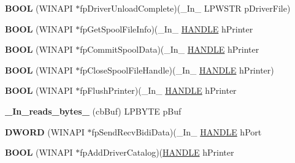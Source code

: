 \begin{DoxyCompactItemize}
\mbox{\label{struct___p_r_i_n_t_p_r_o_v_i_d_o_r_a92fa81120c31a8ae567e6370fe8784fe}} 
{\bfseries B\+O\+OL} (W\+I\+N\+A\+PI $\ast$fp\+Driver\+Unload\+Complete)(\+\_\+\+In\+\_\+ L\+P\+W\+S\+TR p\+Driver\+File)
\item 
\mbox{\label{struct___p_r_i_n_t_p_r_o_v_i_d_o_r_afe37be4207dce2d26e65494e7a05f1eb}} 
{\bfseries B\+O\+OL} (W\+I\+N\+A\+PI $\ast$fp\+Get\+Spool\+File\+Info)(\+\_\+\+In\+\_\+ \hyperlink{interfacevoid}{H\+A\+N\+D\+LE} h\+Printer
\item 
\mbox{\label{struct___p_r_i_n_t_p_r_o_v_i_d_o_r_af505fe62878139c4e4bd8189414ad229}} 
{\bfseries B\+O\+OL} (W\+I\+N\+A\+PI $\ast$fp\+Commit\+Spool\+Data)(\+\_\+\+In\+\_\+ \hyperlink{interfacevoid}{H\+A\+N\+D\+LE} h\+Printer
\item 
\mbox{\label{struct___p_r_i_n_t_p_r_o_v_i_d_o_r_a56e7cdcb09cbcbadaa28f021727e9acd}} 
{\bfseries B\+O\+OL} (W\+I\+N\+A\+PI $\ast$fp\+Close\+Spool\+File\+Handle)(\+\_\+\+In\+\_\+ \hyperlink{interfacevoid}{H\+A\+N\+D\+LE} h\+Printer)
\item 
\mbox{\label{struct___p_r_i_n_t_p_r_o_v_i_d_o_r_af7902e0e2fbf2dd754ee2ec2afe89a02}} 
{\bfseries B\+O\+OL} (W\+I\+N\+A\+PI $\ast$fp\+Flush\+Printer)(\+\_\+\+In\+\_\+ \hyperlink{interfacevoid}{H\+A\+N\+D\+LE} h\+Printer
\item 
\mbox{\label{struct___p_r_i_n_t_p_r_o_v_i_d_o_r_a2097686820c69e57259927895e60cb32}} 
{\bfseries \+\_\+\+In\+\_\+reads\+\_\+bytes\+\_\+} (cb\+Buf) L\+P\+B\+Y\+TE p\+Buf
\item 
\mbox{\label{struct___p_r_i_n_t_p_r_o_v_i_d_o_r_aa0e979c46c5407324e8d015966d503e2}} 
{\bfseries D\+W\+O\+RD} (W\+I\+N\+A\+PI $\ast$fp\+Send\+Recv\+Bidi\+Data)(\+\_\+\+In\+\_\+ \hyperlink{interfacevoid}{H\+A\+N\+D\+LE} h\+Port
\item 
\mbox{\label{struct___p_r_i_n_t_p_r_o_v_i_d_o_r_a1bba27ba55594b001bd75b7a601562b3}} 
{\bfseries B\+O\+OL} (W\+I\+N\+A\+PI $\ast$fp\+Add\+Driver\+Catalog)(\hyperlink{interfacevoid}{H\+A\+N\+D\+LE} h\+Printer
\end{DoxyCompactItemize}
